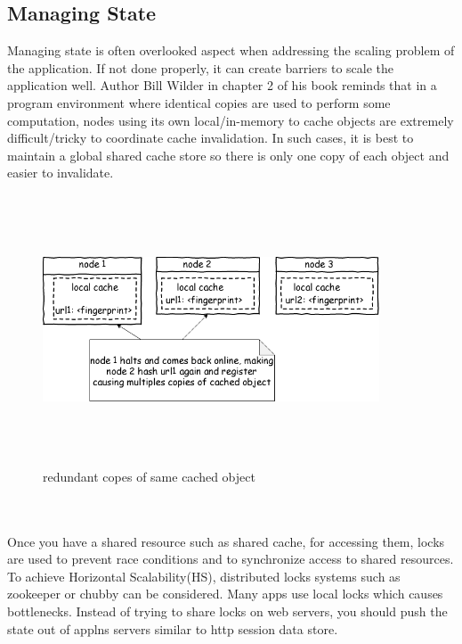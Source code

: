 \subsection{Managing State}\label{managestate}
Managing state is often overlooked aspect when addressing the scaling problem of the application. If not done properly, it can create barriers to scale the application well. Author Bill Wilder in chapter 2 of his
book\cite{manstate} reminds that in a program environment where identical copies are used to perform some computation, nodes using its own local/in-memory to cache objects are extremely difficult/tricky to coordinate cache invalidation. In such cases, it is best to maintain a global shared cache store so there is only one copy of each object and easier to invalidate.
\begin{figure}[h!]
  \centering
  \includegraphics[width=10cm,height=8cm,keepaspectratio]{../media/crawler/multi-cache-wrng.png}
  \caption{redundant copes of same cached object \cite{manstate}}
  \label{fig:wrngcache}
\end{figure}
\\
\\
\noindent
Once you have a shared resource such as shared cache, for accessing them, locks are used to prevent race conditions and to synchronize access to shared resources. To achieve Horizontal Scalability(HS), distributed locks systems such as zookeeper \cite{zookeeper} or chubby \cite{chubby} can be considered. Many apps use local locks which causes bottlenecks. Instead of trying to share locks on web servers, you
should push the state out of applns servers similar to http session data store.
